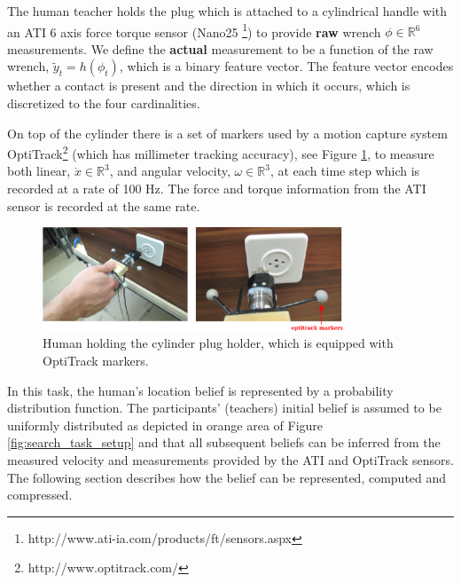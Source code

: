 The human teacher holds the plug which is attached to a cylindrical handle with 
an ATI 6 axis force torque sensor (Nano25 \footnote{http://www.ati-ia.com/products/ft/sensors.aspx}) 
to provide \textbf{raw} wrench $\phi \in \mathbb{R}^6$ measurements. We define the \textbf{actual} measurement 
to be a function of the raw wrench, $\tilde{y}_t = h(\phi_t)$, which is a binary feature vector. The feature vector encodes whether a contact is present 
and the direction in which it occurs, which is discretized to the four cardinalities.

On top of the cylinder there is a set of markers used by a motion capture system OptiTrack\footnote{http://www.optitrack.com/}
(which has millimeter tracking accuracy), 
see Figure \ref{fig:plug_cylinder}, to measure both linear, $\dot{x} \in \mathbb{R}^3$, and angular 
velocity, $\omega \in \mathbb{R}^3$, at each time step which is recorded at a rate of 100 Hz. The force and torque information 
from the ATI sensor is recorded at the same rate. 

\begin{figure}
 \centering
 \includegraphics[width=0.8\textwidth]{./ch4-PiH/Figures/Fig/plug_socket_closeup.pdf}
 \caption{Human holding the cylinder plug holder, which is equipped with OptiTrack markers.}
 \label{fig:plug_cylinder}
\end{figure}

In this task, the human's location belief is represented by a probability distribution function. 
The participants' (teachers) initial belief is assumed to be uniformly distributed as depicted 
in orange area of Figure \ref{fig:search_task_setup} and that all subsequent beliefs can be inferred from the measured velocity 
and measurements provided by the ATI and OptiTrack sensors. The following section describes how the belief can be represented, 
computed and compressed.

